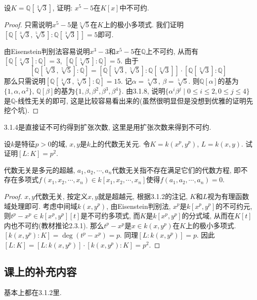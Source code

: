 \documentclass{../solutions-cn}
\begin{document}
\begin{exercise}[习题3.1.14]
    设$K = \mathbb{Q}[\sqrt[3]{3}]$, 证明: $x^5 - 5$在$K[x]$中不可约.
\end{exercise}

\begin{proof}
    只需说明$x^5 - 5$是$\sqrt[5]{5}$在$K$上的极小多项式. 我们证明$\left[\mathbb{Q}[\sqrt[3]{3}, \sqrt[5]{5}]:\mathbb{Q}[\sqrt[3]{3}]\right] = 5$即可.

    由Eisenstein判别法容易说明$x^3 - 3$和$x^5 - 5$在$\mathbb{Q}$上不可约, 从而有$\left[\mathbb{Q}[\sqrt[3]{3}]:\mathbb{Q}\right] = 3$, $\left[\mathbb{Q}[\sqrt[5]{5}]:\mathbb{Q}\right] = 5$. 由于
    \[
        \left[\mathbb{Q}[\sqrt[3]{3}, \sqrt[5]{5}]:\mathbb{Q}\right] = \left[\mathbb{Q}[\sqrt[3]{3}, \sqrt[5]{5}]:\mathbb{Q}[\sqrt[3]{3}]\right] \cdot \left[\mathbb{Q}[\sqrt[3]{3}]:\mathbb{Q}\right]
    \]
    那么只需说明$\left[\mathbb{Q}[\sqrt[3]{3}, \sqrt[5]{5}]:\mathbb{Q}\right] = 15$. 记$\alpha = \sqrt[3]{3}$, $\beta = \sqrt[5]{5}$. 则$\mathbb{Q}[\alpha]$的基为$\{1, \alpha, \alpha^2\}$, $\mathbb{Q}[\beta]$的基为$\{1, \beta, \beta^2, \beta^3, \beta^4\}$. 由3.1.8, 说明$\{\alpha^i\beta^j \mid 0 \leqslant i \leqslant 2, 0 \leqslant j \leqslant 4\}$是$\mathbb{Q}$-线性无关的即可, 这是比较容易看出来的(虽然很明显但是没想到优雅的证明先挖个坑).
\end{proof}

\begin{remark}
    3.1.4是直接证不可约得到扩张次数, 这里是用扩张次数来得到不可约.
\end{remark}

\begin{exercise}[习题3.1.15]
    设$k$是特征$p > 0$的域, $x, y$是$k$上的代数无关元. 令$K = k(x^{p}, y^{p})$, $L = k(x, y)$. 试证明$[L:K] = p^{2}$.
\end{exercise}

\begin{remark}
    代数无关是多元的超越, $a_1, a_2, \cdots, a_n$代数无关指不存在满足它们的代数方程, 即不存在多项式$f(x_1, x_2, \cdots, x_n) \in k[x_1, x_2, \cdots, x_n]$使得$f(a_1, a_2, \cdots, a_n) = 0$.
\end{remark}

\begin{proof}
    $x, y$代数无关, 按定义$x, y$就是超越元, 根据3.1.2的注记, $K$和$L$视为有理函数域处理即可. 考虑中间域$k(x, y^p)$, 由Eisenstein判别法, $x^p$是$k[x^p, y^p]$的不可约元, 则$t^p - x^p \in k[x^p, y^p][t]$是不可约多项式, 而$K$是$k[x^p, y^p]$的分式域, 从而在$K[t]$内也不可约(教材推论2.3.1). 那么$t^p - x^p$是$x \in k(x, y^p)$在$K$上的极小多项式. $[k(x, y^p):K] = \deg(t^p - x^p) = p$. 同理$[L:k(x, y^p)] = p$. 因此$[L:K] = [L:k(x, y^p)] \cdot [k(x, y^p):K] = p^2$.
\end{proof}

\subsection*{课上的补充内容}
基本上都在3.1.2里.
\end{document}
